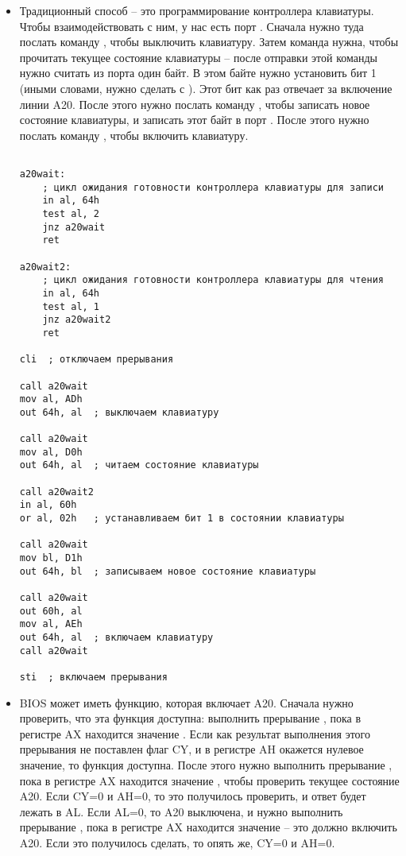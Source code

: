 \documentclass[a4page]{article}
\begin{document}
\begin{itemize}
    \item 
        Традиционный способ -- это программирование контроллера клавиатуры.
        Чтобы взаимодействовать с ним, у нас есть порт .
        Сначала нужно туда послать команду , чтобы выключить клавиатуру.
        Затем команда  нужна, чтобы прочитать текущее состояние клавиатуры --
        после отправки этой команды нужно считать из порта  один байт.
        В этом байте нужно установить бит 1 (иными словами, нужно сделать  с ).
        Этот бит как раз отвечает за включение линии A20.
        После этого нужно послать команду , чтобы записать новое состояние клавиатуры,
        и записать этот байт в порт .
        После этого нужно послать команду , чтобы включить клавиатуру.

\begin{verbatim}

a20wait:
    ; цикл ожидания готовности контроллера клавиатуры для записи
    in al, 64h
    test al, 2
    jnz a20wait
    ret

a20wait2:
    ; цикл ожидания готовности контроллера клавиатуры для чтения
    in al, 64h
    test al, 1
    jnz a20wait2
    ret

cli  ; отключаем прерывания

call a20wait
mov al, ADh
out 64h, al  ; выключаем клавиатуру

call a20wait
mov al, D0h
out 64h, al  ; читаем состояние клавиатуры

call a20wait2
in al, 60h
or al, 02h   ; устанавливаем бит 1 в состоянии клавиатуры

call a20wait
mov bl, D1h
out 64h, bl  ; записываем новое состояние клавиатуры

call a20wait
out 60h, al
mov al, AEh
out 64h, al  ; включаем клавиатуру
call a20wait

sti  ; включаем прерывания
\end{verbatim}


    \item
        BIOS может иметь функцию, которая включает A20.
        Сначала нужно проверить, что эта функция доступна:
        выполнить прерывание , пока в регистре AX находится значение .
        Если как результат выполнения этого прерывания не поставлен флаг CY,
        и в регистре AH окажется нулевое значение,
        то функция доступна.
        После этого нужно выполнить прерывание , пока в регистре AX находится значение ,
        чтобы проверить текущее состояние A20.
        Если CY=0 и AH=0, то это получилось проверить, и ответ будет лежать в AL.
        Если AL=0, то A20 выключена, и нужно выполнить прерывание
        , пока в регистре AX находится значение  -- 
        это должно включить A20.
        Если это получилось сделать, то опять же, CY=0 и AH=0.


\end{itemize}
\end{document}
